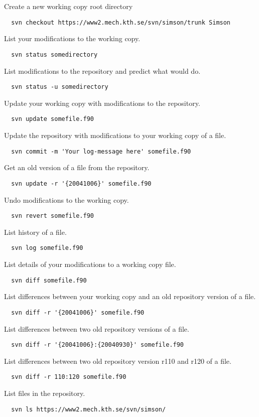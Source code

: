 \documentclass[10pt,a4paper]{simson}
\begin{document}
Create a new working copy root directory
\begin{verbatim}
  svn checkout https://www2.mech.kth.se/svn/simson/trunk Simson
\end{verbatim}
List your modifications to the working copy.
\begin{verbatim}
  svn status somedirectory
\end{verbatim}
List modifications to the repository and predict what
 would do.
\begin{verbatim}
  svn status -u somedirectory
\end{verbatim}
Update your working copy with modifications to the repository.
\begin{verbatim}
  svn update somefile.f90
\end{verbatim}
Update the repository with modifications to your working copy of a
file.
\begin{verbatim}
  svn commit -m 'Your log-message here' somefile.f90
\end{verbatim}
Get an old version of a file from the repository.
\begin{verbatim}
  svn update -r '{20041006}' somefile.f90
\end{verbatim}
Undo modifications to the working copy.
\begin{verbatim}
  svn revert somefile.f90
\end{verbatim}
List history of a file.
\begin{verbatim}
  svn log somefile.f90
\end{verbatim}
List details of your modifications to a working copy file.
\begin{verbatim}
  svn diff somefile.f90
\end{verbatim}
List differences between your working copy and an old repository
version of a file.
\begin{verbatim}
  svn diff -r '{20041006}' somefile.f90
\end{verbatim}
List differences between two old repository versions of a file.
\begin{verbatim}
  svn diff -r '{20041006}:{20040930}' somefile.f90
\end{verbatim}
List differences between two old repository version r110 and r120 of a
file.
\begin{verbatim}
  svn diff -r 110:120 somefile.f90
\end{verbatim}
List files in the repository.
\begin{verbatim}
  svn ls https://www2.mech.kth.se/svn/simson/
\end{verbatim}
\end{document}
